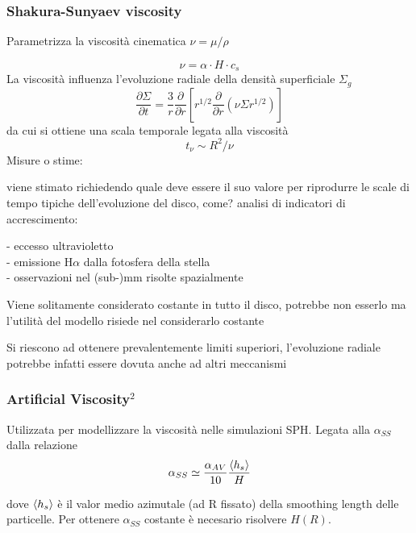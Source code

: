 \documentclass[DIN, pagenumber=false, fontsize=11pt, parskip=half]{scrartcl}
\begin{document}
\subsubsection{Shakura-Sunyaev viscosity}
\label{visc}
Parametrizza la viscosità cinematica $\nu = \mu/\rho$ 

\begin{equation}
\nu = \alpha \cdot H \cdot c_s
\end{equation}
La viscosità influenza l'evoluzione radiale della densità superficiale $\Sigma_g$ 
\begin{equation}
\frac{\partial\Sigma}{\partial t}= \frac{3}{r} \frac{\partial}{\partial r} [r^{1/2}\frac{\partial}{\partial r}(\nu\Sigma r^{1/2})]
\end{equation}
da cui si ottiene una scala temporale legata alla viscosità
\begin{equation}
t_\nu \sim R^2/\nu
\end{equation}
Misure o stime:

viene stimato richiedendo quale deve essere il suo valore per riprodurre le scale di tempo tipiche dell'evoluzione del disco, come? analisi di indicatori di accrescimento:

- eccesso ultravioletto \\
- emissione H$\alpha$  dalla fotosfera della stella\\
- osservazioni nel (sub-)mm risolte spazialmente

Viene solitamente considerato costante in tutto il disco, potrebbe non esserlo ma l'utilità del modello risiede nel considerarlo costante

Si riescono ad ottenere prevalentemente limiti superiori, l'evoluzione radiale potrebbe infatti essere dovuta anche ad altri meccanismi

\subsubsection{Artificial Viscosity\hyperref[source]{$^2$}}
\label{artvisc}

Utilizzata per modellizzare la viscosità nelle simulazioni SPH.
Legata alla $\alpha_{SS}$ dalla relazione 
\begin{equation}
\alpha_{SS} \simeq \frac{\alpha_{AV}}{10}\frac{\ev{h_s}}{H}
\end{equation}

dove $\ev{h_s}$ è il valor medio azimutale (ad R fissato) della smoothing length delle particelle.
Per ottenere $\alpha_{SS}$ costante è necesario risolvere $H(R)$.
\end{document}
